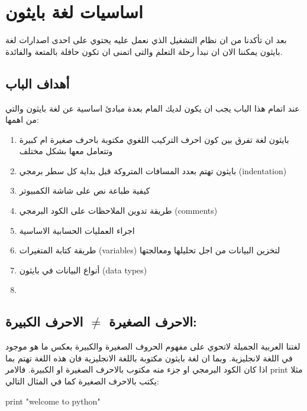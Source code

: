 \chapter{اساسيات لغة بايثون}
بعد ان تأكدنا من ان نظام التشغيل الذي نعمل عليه يحتوي على احدى اصدارات لغة بايثون يمكننا الان ان نبدأ رحلة التعلم والتى اتمنى ان تكون حافلة بالمتعة والفائدة.\\
\section{أهداف الباب}
عند اتمام هذا الباب يجب ان يكون لديك المام بعدة مبادئ اساسية عن لغة بايثون والتي من اهمها:
\begin{enumerate}
\item
بايثون لغة تفرق بين كون احرف التركيب اللغوي مكتوبة باحرف صغيرة ام كبيرة وتتعامل معها بشكل مختلف
\item
بايثون تهتم بعدد المسافات المتروكة قبل بداية كل سطر برمجي
\textenglish{(indentation)}
\item
كيفية طباعة نص على شاشة الكمبيوتر
\item
طريقة تدوين الملاحظات على الكود البرمجي
\textenglish{(comments)}
\item
اجراء العمليات الحسابية الاساسية 
\item
طريقة كتابة المتغيرات
\textenglish{(variables)}
 لتخزين البيانات من اجل تحليلها ومعالجتها
\item
أنواع البيانات في بايثون
\textenglish{(data types)}
\item

\end{enumerate}

\section{ الاحرف الصغيرة $\neq$ الاحرف الكبيرة:}
لغتنا العربية الجميلة لاتحوي على مفهوم الحروف الصغيرة والكبيرة بعكس ما هو موجود في اللغة لانجليزية. وبما ان لغة بايثون مكتوبة باللغة الانجليزية فان هذه اللغة تهتم بما اذا كان الكود البرمجي او جزء منه مكتوب بالاحرف الصغيرة او الكبيرة. فالامر print مثلا يكتب بالاحرف الصغيرة كما في المثال التالي:\\
\begin{english}
\begin{tcolorbox}
\begin{pyconsole}
print "welcome to python"
\end{pyconsole}
\end{tcolorbox}
\end{english}

